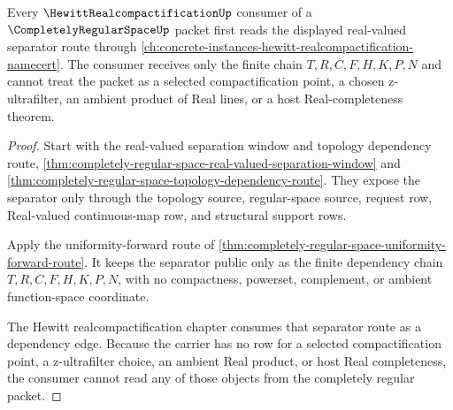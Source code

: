 \begin{theorem}
\label{thm:completely-regular-space-realcompactification-consumer-route}
Every $\HewittRealcompactificationUp$ consumer of a $\CompletelyRegularSpaceUp$ packet first reads the displayed real-valued separator route through \autoref{ch:concrete-instances-hewitt-realcompactification-namecert}. The consumer receives only the finite chain $T,R,C,F,H,K,P,N$ and cannot treat the packet as a selected compactification point, a chosen z-ultrafilter, an ambient product of Real lines, or a host Real-completeness theorem.
\end{theorem}
\begin{proof}
Start with the real-valued separation window and topology dependency route, \autoref{thm:completely-regular-space-real-valued-separation-window} and \autoref{thm:completely-regular-space-topology-dependency-route}. They expose the separator only through the topology source, regular-space source, request row, Real-valued continuous-map row, and structural support rows.

Apply the uniformity-forward route of \autoref{thm:completely-regular-space-uniformity-forward-route}. It keeps the separator public only as the finite dependency chain $T,R,C,F,H,K,P,N$, with no compactness, powerset, complement, or ambient function-space coordinate.

The Hewitt realcompactification chapter consumes that separator route as a dependency edge. Because the carrier has no row for a selected compactification point, a z-ultrafilter choice, an ambient Real product, or host Real completeness, the consumer cannot read any of those objects from the completely regular packet.
\end{proof}

